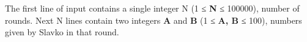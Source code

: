 The first line of input contains a single integer N (1 ≤ \textbf{N} ≤ 100000), number of rounds. Next N lines contain two integers \textbf{A} and \textbf{B} (1 ≤ \textbf{A, B} ≤ 100), numbers given by Slavko in that round.